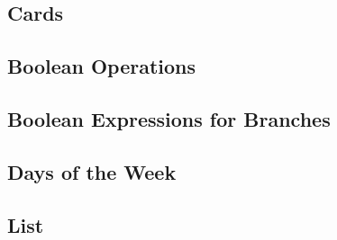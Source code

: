 
\subsection{Cards} \label{cards}


\newpage
\subsection{Boolean Operations} \label{bool_ops}


\newpage
\subsection{Boolean Expressions for Branches} \label{bool_expr}


\newpage
\subsection{Days of the Week} \label{days}


\newpage
\subsection{List} \label{list}












